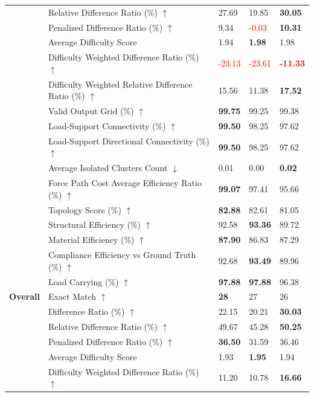 \begin{table}[!h]
{\begin{tabular}{lllll}
 & Relative Difference Ratio (\%) $\uparrow$ & 27.69 & 19.85 & \textbf{30.05} \\
 & Penalized Difference Ratio (\%) $\uparrow$ & 9.34 & \textcolor{red}{-0.03} & \textbf{10.31} \\
 & Average Difficulty Score & 1.94 & \textbf{1.98} & 1.98 \\
 & Difficulty Weighted Difference Ratio (\%) $\uparrow$ & \textcolor{red}{-23.13} & \textcolor{red}{-23.61} & \textbf{\textcolor{red}{-11.33}} \\
 & Difficulty Weighted Relative Difference Ratio (\%) $\uparrow$ & 15.56 & 11.38 & \textbf{17.52} \\
 & Valid Output Grid (\%) $\uparrow$ & \textbf{99.75} & 99.25 & 99.38 \\
 & Load-Support Connectivity (\%) $\uparrow$ & \textbf{99.50} & 98.25 & 97.62 \\
 & Load-Support Directional Connectivity (\%) $\uparrow$ & \textbf{99.50} & 98.25 & 97.62 \\
 & Average Isolated Clusters Count $\downarrow$ & 0.01 & 0.00 & \textbf{0.02} \\
 & Force Path Cost Average Efficiency Ratio (\%) $\uparrow$ & \textbf{99.07} & 97.41 & 95.66 \\
 & Topology Score (\%) $\uparrow$ & \textbf{82.88} & 82.61 & 81.05 \\
 & Structural Efficiency (\%) $\uparrow$ & 92.58 & \textbf{93.36} & 89.72 \\
 & Material Efficiency (\%) $\uparrow$ & \textbf{87.90} & 86.83 & 87.29 \\
 & Compliance Efficiency vs Ground Truth (\%) $\uparrow$ & 92.68 & \textbf{93.49} & 89.96 \\
 & Load Carrying (\%) $\uparrow$ & \textbf{97.88} & \textbf{97.88} & 96.38 \\
\midrule\midrule
\textbf{Overall} & Exact Match $\uparrow$ & \textbf{28} & 27 & 26 \\
 & Difference Ratio (\%) $\uparrow$ & 22.15 & 20.21 & \textbf{30.03} \\
 & Relative Difference Ratio (\%) $\uparrow$ & 49.67 & 45.28 & \textbf{50.25} \\
 & Penalized Difference Ratio (\%) $\uparrow$ & \textbf{36.50} & 31.59 & 36.46 \\
 & Average Difficulty Score & 1.93 & \textbf{1.95} & 1.94 \\
 & Difficulty Weighted Difference Ratio (\%) $\uparrow$ & 11.20 & 10.78 & \textbf{16.66} \\

\end{tabular}}
\end{table}
